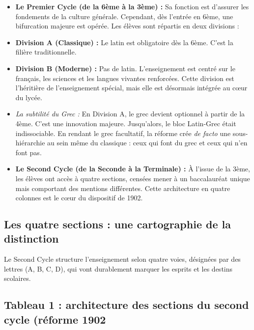 \begin{itemize}\item \textbf{Le Premier Cycle (de la 6ème à la 3ème) :} Sa fonction est d'assurer les fondements de la culture générale. Cependant, dès l'entrée en 6ème, une bifurcation majeure est opérée. Les élèves sont répartis en deux divisions :\item \textbf{Division A (Classique) :} Le latin est obligatoire dès la 6ème. C'est la filière traditionnelle.\item \textbf{Division B (Moderne) :} Pas de latin. L'enseignement est centré sur le français, les sciences et les langues vivantes renforcées. Cette division est l'héritière de l'enseignement spécial, mais elle est désormais intégrée au cœur du lycée.\cite{I-2-1-ref4}\item \textit{La subtilité du Grec :} En Division A, le grec devient optionnel à partir de la 4ème. C'est une innovation majeure. Jusqu'alors, le bloc \og Latin-Grec\fg{} était indissociable. En rendant le grec facultatif, la réforme crée \textit{de facto} une sous-hiérarchie au sein même du classique : ceux qui font du grec et ceux qui n'en font pas.\cite{I-2-1-ref6}\item \textbf{Le Second Cycle (de la Seconde à la Terminale) :} À l'issue de la 3ème, les élèves ont accès à quatre sections, censées mener à un baccalauréat unique mais comportant des mentions différentes. Cette architecture en quatre colonnes est le cœur du dispositif de 1902.\end{itemize}

\subsection{Les quatre sections : une cartographie de la distinction}

Le Second Cycle structure l'enseignement selon quatre voies, désignées par des lettres (A, B, C, D),
qui vont durablement marquer les esprits et les destins scolaires.\cite{I-2-1-ref4}



\subsection{Tableau 1 : architecture des sections du second cycle (réforme 1902\)}

